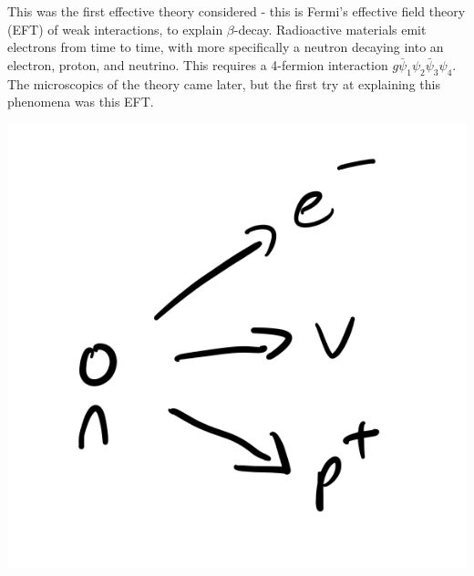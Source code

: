 This was the first effective theory considered - this is Fermi's effective field theory (EFT) of weak interactions, to explain $\beta$-decay. Radioactive materials emit electrons from time to time, with more specifically a neutron decaying into an electron, proton, and neutrino. This requires a 4-fermion interaction $g\bar{\psi}_1\psi_2\bar{\psi}_3\psi_4$. The microscopics of the theory came later, but the first try at explaining this phenomena was this EFT.

\begin{center}
    \includegraphics[scale=0.3]{Lectures/Images/lec6-neutrondecay.png}
\end{center}

